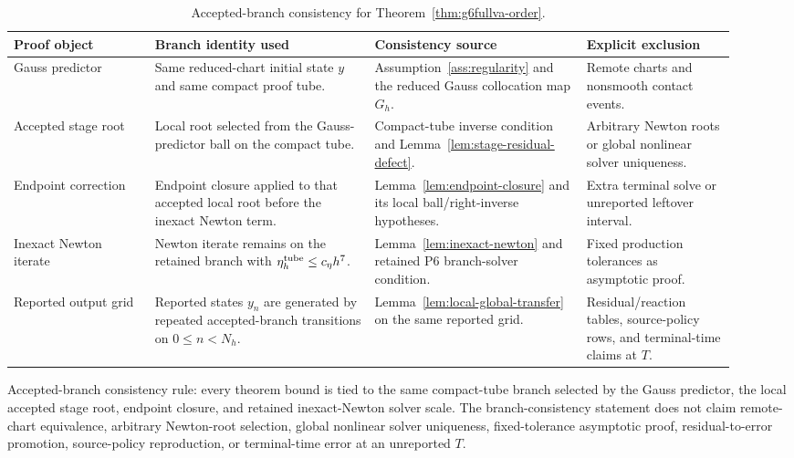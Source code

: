 \documentclass[preprint,12pt]{elsarticle}
\begin{document}
\begin{table}[htbp]
\centering
\caption{Accepted-branch consistency for
Theorem~\ref{thm:g6fullva-order}.}
\label{tab:accepted-branch-consistency-ledger}
\scriptsize
\setlength{\tabcolsep}{2pt}
\renewcommand{\arraystretch}{0.9}
\begin{tabular}{P{0.18\linewidth}P{0.28\linewidth}P{0.27\linewidth}P{0.19\linewidth}}
\toprule
Proof object & Branch identity used & Consistency source & Explicit exclusion \\
\midrule
Gauss predictor &
Same reduced-chart initial state \(y\) and same compact proof tube. &
Assumption~\ref{ass:regularity} and the reduced Gauss collocation map
\(G_h\). &
Remote charts and nonsmooth contact events. \\
Accepted stage root &
Local root selected from the Gauss-predictor ball on the compact tube. &
Compact-tube inverse condition and Lemma~\ref{lem:stage-residual-defect}. &
Arbitrary Newton roots or global nonlinear solver uniqueness. \\
Endpoint correction &
Endpoint closure applied to that accepted local root before the inexact
Newton term. &
Lemma~\ref{lem:endpoint-closure} and its local ball/right-inverse
hypotheses. &
Extra terminal solve or unreported leftover interval. \\
Inexact Newton iterate &
Newton iterate remains on the retained branch with
\(\eta_h^{\rm tube}\le c_\eta h^7\). &
Lemma~\ref{lem:inexact-newton} and retained P6 branch-solver condition. &
Fixed production tolerances as asymptotic proof. \\
Reported output grid &
Reported states \(y_n\) are generated by repeated accepted-branch
transitions on \(0\le n<N_h\). &
Lemma~\ref{lem:local-global-transfer} on the same reported grid. &
Residual/reaction tables, source-policy rows, and terminal-time claims at
\(T\). \\
\bottomrule
\end{tabular}
\end{table}

Accepted-branch consistency rule: every theorem
bound is tied to the same compact-tube branch selected by the Gauss predictor,
the local accepted stage root, endpoint closure, and retained inexact-Newton
solver scale. The branch-consistency statement does not claim remote-chart
equivalence, arbitrary Newton-root selection, global nonlinear solver
uniqueness, fixed-tolerance asymptotic proof, residual-to-error promotion,
source-policy reproduction, or terminal-time error at an unreported \(T\).
\end{document}
